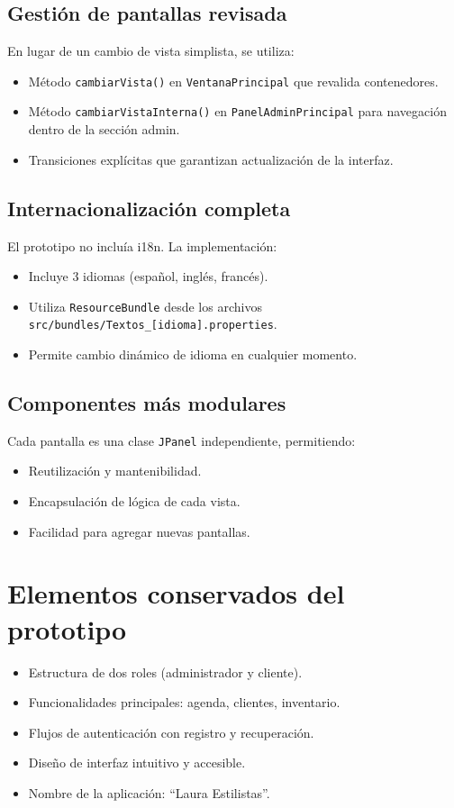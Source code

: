 \documentclass[12pt,a4paper]{report}
\begin{document}
\subsection{Gestión de pantallas revisada}
En lugar de un cambio de vista simplista, se utiliza:
\begin{itemize}
    \item Método \texttt{cambiarVista()} en \texttt{VentanaPrincipal} que revalida contenedores.
    \item Método \texttt{cambiarVistaInterna()} en \texttt{PanelAdminPrincipal} para navegación dentro de la sección admin.
    \item Transiciones explícitas que garantizan actualización de la interfaz.
\end{itemize}

\subsection{Internacionalización completa}
El prototipo no incluía i18n. La implementación:
\begin{itemize}
    \item Incluye 3 idiomas (español, inglés, francés).
    \item Utiliza \texttt{ResourceBundle} desde los archivos \texttt{src/bundles/Textos\_[idioma].properties}.
    \item Permite cambio dinámico de idioma en cualquier momento.
\end{itemize}

\subsection{Componentes más modulares}
Cada pantalla es una clase \texttt{JPanel} independiente, permitiendo:
\begin{itemize}
    \item Reutilización y mantenibilidad.
    \item Encapsulación de lógica de cada vista.
    \item Facilidad para agregar nuevas pantallas.
\end{itemize}

\section{Elementos conservados del prototipo}
\begin{itemize}
    \item Estructura de dos roles (administrador y cliente).
    \item Funcionalidades principales: agenda, clientes, inventario.
    \item Flujos de autenticación con registro y recuperación.
    \item Diseño de interfaz intuitivo y accesible.
    \item Nombre de la aplicación: ``Laura Estilistas''.
\end{itemize}
\end{document}
